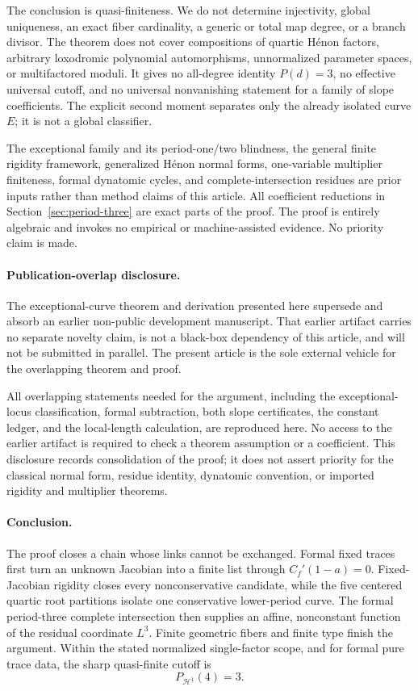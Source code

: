 \documentclass[11pt]{article}
\theoremstyle{definition}
\newcommand{\Hn}{\mathcal H}
\begin{document}
The conclusion is quasi-finiteness. We do not determine injectivity, global uniqueness, an exact fiber cardinality, a generic or total map degree, or a branch divisor. The theorem does not cover compositions of quartic H\'enon factors, arbitrary loxodromic polynomial automorphisms, unnormalized parameter spaces, or multifactored moduli. It gives no all-degree identity $P(d)=3$, no effective universal cutoff, and no universal nonvanishing statement for a family of slope coefficients. The explicit second moment separates only the already isolated curve $E$; it is not a global classifier.

The exceptional family and its period-one/two blindness, the general finite rigidity framework, generalized H\'enon normal forms, one-variable multiplier finiteness, formal dynatomic cycles, and complete-intersection residues are prior inputs rather than method claims of this article. All coefficient reductions in Section~\ref{sec:period-three} are exact parts of the proof. The proof is entirely algebraic and invokes no empirical or machine-assisted evidence. No priority claim is made.

\paragraph{Publication-overlap disclosure.}
The exceptional-curve theorem and derivation presented here supersede and absorb an earlier non-public development manuscript. That earlier artifact carries no separate novelty claim, is not a black-box dependency of this article, and will not be submitted in parallel. The present article is the sole external vehicle for the overlapping theorem and proof.

All overlapping statements needed for the argument, including the exceptional-locus classification, formal subtraction, both slope certificates, the constant ledger, and the local-length calculation, are reproduced here. No access to the earlier artifact is required to check a theorem assumption or a coefficient. This disclosure records consolidation of the proof; it does not assert priority for the classical normal form, residue identity, dynatomic convention, or imported rigidity and multiplier theorems.

\paragraph{Conclusion.}
The proof closes a chain whose links cannot be exchanged. Formal fixed traces first turn an unknown Jacobian into a finite list through $C_f'(1-a)=0$. Fixed-Jacobian rigidity closes every nonconservative candidate, while the five centered quartic root partitions isolate one conservative lower-period curve. The formal period-three complete intersection then supplies an affine, nonconstant function of the residual coordinate $L^3$. Finite geometric fibers and finite type finish the argument. Within the stated normalized single-factor scope, and for formal pure trace data, the sharp quasi-finite cutoff is
\[
P_{\Hn^1}(4)=3.
\]
\end{document}
